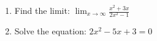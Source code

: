 \documentclass{article}
\begin{document}
\begin{enumerate}
\item Find the limit: $\displaystyle \lim_{x \to \infty} \frac{x^2 + 3x}{2x^2 - 1}$
\item Solve the equation: $2x^2 - 5x + 3 = 0$
\end{enumerate}
\end{document}
